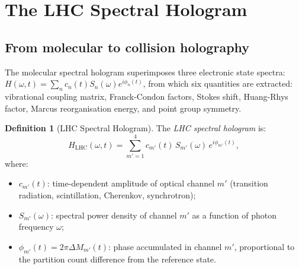 \documentclass[twocolumn,10pt,a4paper]{article}
\theoremstyle{thmstyle}
\theoremstyle{definition}
\newtheorem{definition}[theorem]{Definition}
\theoremstyle{remark}
\newcommand{\Hologram}{H_{\mathrm{LHC}}}
\begin{document}
\section{The LHC Spectral Hologram}
\label{sec:hologram}

\subsection{From molecular to collision holography}

The molecular spectral hologram \citep{companion:hologram} superimposes
three electronic state spectra:
$H(\omega,t) = \sum_n c_n(t) S_n(\omega) e^{i\phi_n(t)}$,
from which six quantities are extracted: vibrational coupling matrix,
Franck-Condon factors, Stokes shift, Huang-Rhys factor, Marcus
reorganisation energy, and point group symmetry.

\begin{definition}[LHC Spectral Hologram]
\label{def:lhc_hologram}
The \emph{LHC spectral hologram} is:
\begin{equation}
\Hologram(\omega, t) = \sum_{m'=1}^4 c_{m'}(t)\,S_{m'}(\omega)\,e^{i\phi_{m'}(t)},
\label{eq:lhc_hologram}
\end{equation}
where:
\begin{itemize}[nosep]
\item $c_{m'}(t)$: time-dependent amplitude of optical channel $m'$
  (transition radiation, scintillation, Cherenkov, synchrotron);
\item $S_{m'}(\omega)$: spectral power density of channel $m'$ as a function
  of photon frequency $\omega$;
\item $\phi_{m'}(t) = 2\pi \Delta M_{m'}(t)$: phase accumulated in channel
  $m'$, proportional to the partition count difference from the reference
  state.
\end{itemize}
\end{definition}
\end{document}
